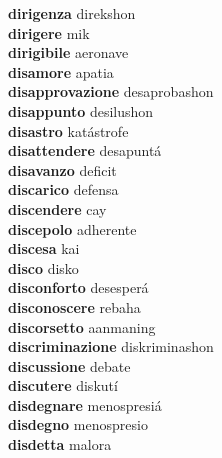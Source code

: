 \textbf{dirigenza } direkshon \\
\textbf{dirigere } mik \\
\textbf{dirigibile } aeronave \\
\textbf{disamore } apatia \\
\textbf{disapprovazione } desaprobashon \\
\textbf{disappunto } desilushon \\
\textbf{disastro } katástrofe \\
\textbf{disattendere } desapuntá \\
\textbf{disavanzo } deficit \\
\textbf{discarico } defensa \\
\textbf{discendere } cay \\
\textbf{discepolo } adherente \\
\textbf{discesa } kai \\
\textbf{disco } disko \\
\textbf{disconforto } desesperá \\
\textbf{disconoscere } rebaha \\
\textbf{discorsetto } aanmaning \\
\textbf{discriminazione } diskriminashon \\
\textbf{discussione } debate \\
\textbf{discutere } diskutí \\
\textbf{disdegnare } menospresiá \\
\textbf{disdegno } menospresio \\
\textbf{disdetta } malora \\
